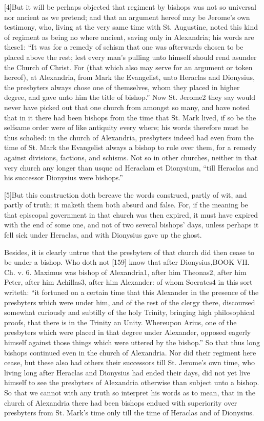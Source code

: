 [4]But it will be perhaps objected that regiment by bishops was not so universal nor ancient as we pretend; and that an argument hereof may be Jerome’s own testimony, who, living at the very same time with St. Augustine, noted this kind of regiment as being no where ancient, saving only in Alexandria; his words are these1: “It was for a remedy of schism that one was afterwards chosen to be placed above the rest; lest every man’s pulling unto himself should rend asunder the Church of Christ. For (that which also may serve for an argument or token hereof), at Alexandria, from Mark the Evangelist, unto Heraclas and Dionysius, the presbyters always chose one of themselves, whom they placed in higher degree, and gave unto him the title of bishop.” Now St. Jerome2 they say would never have picked out that one church from amongst so many, and have noted that in it there had been bishops from the time that St. Mark lived, if so be the selfsame order were of like antiquity every where; his words therefore must be thus scholied: in the church of Alexandria, presbyters indeed had even from the time of St. Mark the Evangelist always a bishop to rule over them, for a remedy against divisions, factions, and schisms. Not so in other churches, neither in that very church any longer than usque ad Heraclam et Dionysium, “till Heraclas and his successor Dionysius were bishops.”

[5]But this construction doth bereave the words construed, partly of wit, and partly of truth; it maketh them both absurd and false. For, if the meaning be that episcopal government in that church was then expired, it must have expired with the end of some one, and not of two several bishops’ days, unless perhaps it fell sick under Heraclas, and with Dionysius gave up the ghost.

Besides, it is clearly untrue that the presbyters of that church did then cease to be under a bishop. Who doth not [159] know that after Dionysius,BOOK VII. Ch. v. 6. Maximus was bishop of Alexandria1, after him Theonas2, after him Peter, after him Achillas3, after him Alexander: of whom Socrates4 in this sort writeth: “it fortuned on a certain time that this Alexander in the presence of the presbyters which were under him, and of the rest of the clergy there, discoursed somewhat curiously and subtilly of the holy Trinity, bringing high philosophical proofs, that there is in the Trinity an Unity. Whereupon Arius, one of the presbyters which were placed in that degree under Alexander, opposed eagerly himself against those things which were uttered by the bishop.” So that thus long bishops continued even in the church of Alexandria. Nor did their regiment here cease, but these also had others their successors till St. Jerome’s own time, who living long after Heraclas and Dionysius had ended their days, did not yet live himself to see the presbyters of Alexandria otherwise than subject unto a bishop. So that we cannot with any truth so interpret his words as to mean, that in the church of Alexandria there had been bishops endued with superiority over presbyters from St. Mark’s time only till the time of Heraclas and of Dionysius.

